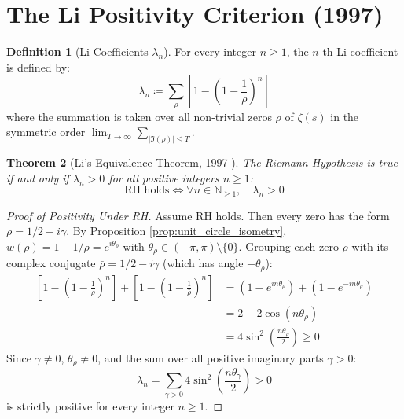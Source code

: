\documentclass[11pt,a4paper]{article}
\newtheorem{theorem}{Theorem}[section]
\theoremstyle{definition}
\newtheorem{definition}[theorem]{Definition}
\begin{document}
\section{The Li Positivity Criterion (1997)}

\begin{definition}[Li Coefficients $\lambda_n$]\label{def:li_coeffs}
For every integer $n \ge 1$, the $n$-th Li coefficient is defined by:
\begin{equation}\label{eq:li_def}
\lambda_n \coloneqq \sum_\rho \left[ 1 - \left( 1 - \frac{1}{\rho} \right)^n \right]
\end{equation}
where the summation is taken over all non-trivial zeros $\rho$ of $\zeta(s)$ in the symmetric order $\lim_{T \to \infty} \sum_{|\Im(\rho)| \le T}$.
\end{definition}

\begin{theorem}[Li's Equivalence Theorem, 1997 \cite{li1997}]\label{thm:li_criterion}
The Riemann Hypothesis is true if and only if $\lambda_n > 0$ for all positive integers $n \ge 1$:
\begin{equation}\label{eq:li_rh_iff}
\text{RH holds} \iff \forall n \in \mathbb{N}_{\ge 1}, \quad \lambda_n > 0
\end{equation}
\end{theorem}

\begin{proof}[Proof of Positivity Under RH]
Assume RH holds. Then every zero has the form $\rho = 1/2 + i\gamma$.
By Proposition \ref{prop:unit_circle_isometry}, $w(\rho) = 1 - 1/\rho = e^{i\theta_\rho}$ with $\theta_\rho \in (-\pi, \pi) \setminus \{0\}$.
Grouping each zero $\rho$ with its complex conjugate $\bar{\rho} = 1/2 - i\gamma$ (which has angle $-\theta_\rho$):
\begin{align*}
\left[ 1 - \left( 1 - \frac{1}{\rho} \right)^n \right] + \left[ 1 - \left( 1 - \frac{1}{\bar{\rho}} \right)^n \right] &= (1 - e^{i n \theta_\rho}) + (1 - e^{-i n \theta_\rho}) \\
&= 2 - 2 \cos(n \theta_\rho) \\
&= 4 \sin^2\left( \frac{n \theta_\rho}{2} \right) \ge 0
\end{align*}
Since $\gamma \ne 0$, $\theta_\rho \ne 0$, and the sum over all positive imaginary parts $\gamma > 0$:
\[ \lambda_n = \sum_{\gamma > 0} 4 \sin^2\left( \frac{n \theta_\gamma}{2} \right) > 0 \]
is strictly positive for every integer $n \ge 1$.
\end{proof}
\end{document}
